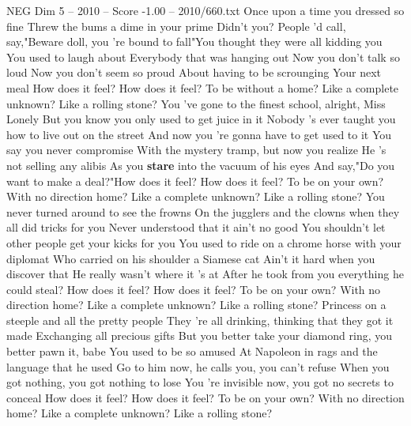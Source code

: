 \begin{textsample}{NEG Dim 5 – 2010 – Score -1.00 – 2010/660.txt}  \label{ex:f5_neg_010}
Once upon a time you dressed so fine Threw the bums a dime in your prime Didn't you?
People 'd call, say,"Beware doll, you 're bound to fall"You thought they were all kidding you You used to laugh about Everybody that was hanging out Now you don't talk so loud Now you don't seem so proud About having to be scrounging Your next meal How does it feel?
How does it feel?
To be without a home?
Like a complete unknown?
Like a rolling stone?
You 've gone to the finest school, alright, Miss Lonely But you know you only used to get juice in it Nobody 's ever taught you how to live out on the street And now you 're gonna have to get used to it You say you never compromise With the mystery tramp, but now you realize He 's not selling any alibis As you \textbf{stare} into the vacuum of his eyes And say,"Do you want to make a deal?"How does it feel?
How does it feel?
To be on your own?
With no direction home?
Like a complete unknown?
Like a rolling stone?
You never turned around to see the frowns On the jugglers and the clowns when they all did tricks for you Never understood that it ain't no good You shouldn't let other people get your kicks for you You used to ride on a chrome horse with your diplomat Who carried on his shoulder a Siamese cat Ain't it hard when you discover that He really wasn't where it 's at After he took from you everything he could steal?
How does it feel?
How does it feel?
To be on your own?
With no direction home?
Like a complete unknown?
Like a rolling stone?
Princess on a steeple and all the pretty people They 're all drinking, thinking that they got it made Exchanging all precious gifts But you better take your diamond ring, you better pawn it, babe You used to be so amused At Napoleon in rags and the language that he used Go to him now, he calls you, you can't refuse When you got nothing, you got nothing to lose You 're invisible now, you got no secrets to conceal How does it feel?
How does it feel?
To be on your own?
With no direction home?
Like a complete unknown?
Like a rolling stone?

\end{textsample}
